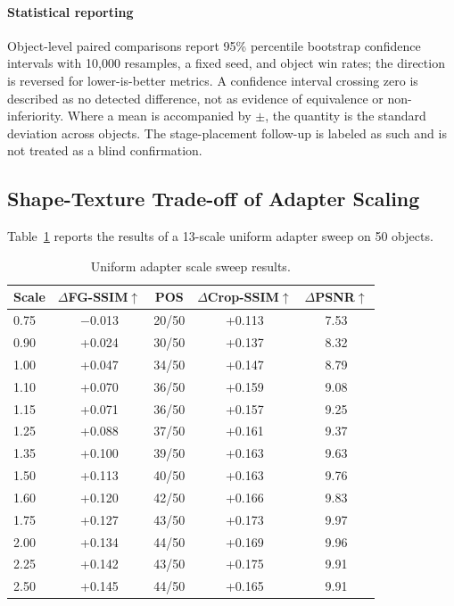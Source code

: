 \documentclass[times,twocolumn,final]{elsarticle}
\begin{document}
\paragraph{Statistical reporting}
Object-level paired comparisons report 95\% percentile bootstrap confidence intervals with 10{,}000 resamples, a fixed seed, and object win rates; the direction is reversed for lower-is-better metrics. A confidence interval crossing zero is described as no detected difference, not as evidence of equivalence or non-inferiority. Where a mean is accompanied by $\pm$, the quantity is the standard deviation across objects. The stage-placement follow-up is labeled as such and is not treated as a blind confirmation.

\iffalse
\subsection{Shape-Texture Trade-off of Adapter Scaling}
\label{subsec:tradeoff}

Table~\ref{tab:sweep} reports the results of a 13-scale uniform adapter sweep on 50 objects.

\begin{table}[t]
\centering
\caption{Uniform adapter scale sweep results.}
\label{tab:sweep}
\small
\begin{tabular}{lcccc}
\toprule
Scale & $\Delta$FG-SSIM$\uparrow$ & POS & $\Delta$Crop-SSIM$\uparrow$ & $\Delta$PSNR$\uparrow$ \\
\midrule
0.75 & $-$0.013 & 20/50 & +0.113 & 7.53 \\
0.90 & +0.024 & 30/50 & +0.137 & 8.32 \\
1.00 & +0.047 & 34/50 & +0.147 & 8.79 \\
1.10 & +0.070 & 36/50 & +0.159 & 9.08 \\
1.15 & +0.071 & 36/50 & +0.157 & 9.25 \\
1.25 & +0.088 & 37/50 & +0.161 & 9.37 \\
1.35 & +0.100 & 39/50 & +0.163 & 9.63 \\
1.50 & +0.113 & 40/50 & +0.163 & 9.76 \\
1.60 & +0.120 & 42/50 & +0.166 & 9.83 \\
1.75 & +0.127 & 43/50 & +0.173 & 9.97 \\
2.00 & +0.134 & 44/50 & +0.169 & 9.96 \\
2.25 & +0.142 & 43/50 & +0.175 & 9.91 \\
2.50 & +0.145 & 44/50 & +0.165 & 9.91 \\
\bottomrule
\end{tabular}
\end{table}
\end{document}
